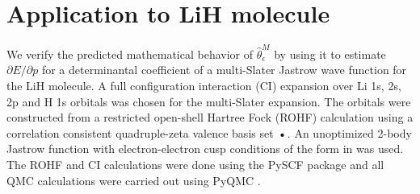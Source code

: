\documentclass[twocolumn]{revtex4-1}
\begin{document}
\section{Application to LiH molecule}
We verify the predicted mathematical behavior of $\hat{\theta}_\epsilon^M$ by using it to estimate $\partial E/\partial p$ for a determinantal coefficient of a multi-Slater Jastrow wave function for the LiH molecule.
A full configuration interaction (CI) expansion over Li 1s, 2s, 2p and H 1s orbitals was chosen for the multi-Slater expansion.
The orbitals were constructed from a restricted open-shell Hartree Fock (ROHF) calculation using a correlation consistent quadruple-zeta valence basis set \cite{doi:10.1063/1.456153}\textbf{•}.
An unoptimized 2-body Jastrow function with electron-electron cusp conditions of the form in \cite{Wagner2009} was used.
The ROHF and CI calculations were done using the PySCF package \cite{PYSCF} and all QMC calculations were carried out using PyQMC \cite{pyqmc}.
\end{document}
